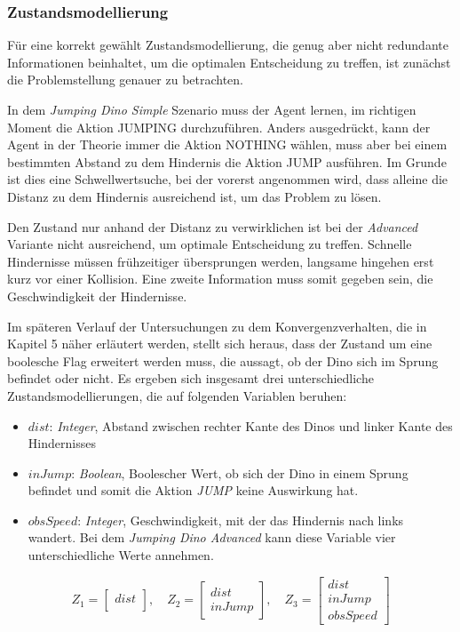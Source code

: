 \subsubsection{Zustandsmodellierung}\label{sec:JDzustandsmodellierung}
Für eine korrekt gewählt Zustandsmodellierung, die genug aber nicht redundante Informationen beinhaltet, um die optimalen Entscheidung zu treffen, ist zunächst die Problemstellung genauer zu betrachten. 
\par 
In dem \textit{Jumping Dino Simple} Szenario muss der Agent lernen, im richtigen Moment die Aktion JUMPING durchzuführen. Anders ausgedrückt, kann der Agent in der Theorie immer die Aktion NOTHING wählen, muss aber bei einem bestimmten Abstand zu dem Hindernis die Aktion JUMP ausführen. Im Grunde ist dies eine Schwellwertsuche, bei der vorerst angenommen wird, dass alleine die Distanz zu dem Hindernis ausreichend ist, um das Problem zu lösen.
\par 
Den Zustand nur anhand der Distanz zu verwirklichen ist bei der \textit{Advanced} Variante nicht ausreichend, um optimale Entscheidung zu treffen. Schnelle Hindernisse müssen frühzeitiger übersprungen werden, langsame hingehen erst kurz vor einer Kollision. Eine zweite Information muss somit gegeben sein, die Geschwindigkeit der Hindernisse.
\par 
Im späteren Verlauf der Untersuchungen zu dem Konvergenzverhalten, die in Kapitel 5 näher erläutert werden, stellt sich heraus, dass der Zustand um eine boolesche Flag erweitert werden muss, die aussagt, ob der Dino sich im Sprung befindet oder nicht. 
Es ergeben sich insgesamt drei unterschiedliche Zustandsmodellierungen, die auf folgenden Variablen beruhen:
\begin{itemize}
 \item $dist$: \textit{Integer}, Abstand zwischen rechter Kante des Dinos und  linker Kante des Hindernisses
 \item $inJump$: \textit{Boolean}, Boolescher Wert, ob sich der Dino in einem Sprung befindet und somit die Aktion \textit{JUMP} keine Auswirkung hat.
 \item $obsSpeed$: \textit{Integer}, Geschwindigkeit, mit der das Hindernis nach links wandert. Bei dem \textit{Jumping Dino Advanced} kann diese Variable vier unterschiedliche Werte annehmen.    
\end{itemize}
\begin{equation}
    Z_{1} =  \begin{bmatrix} dist\\   \end{bmatrix}, \quad
    Z_{2} =  \begin{bmatrix} dist \\ inJump   \end{bmatrix}, \quad
    Z_{3} =  \begin{bmatrix} dist \\ inJump \\ obsSpeed   \end{bmatrix}
\end{equation}

